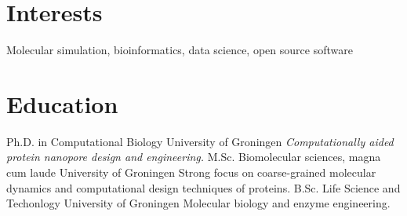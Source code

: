 \documentclass[letterpaper]{twentysecondcv} %
\begin{document}









\makeprofile %


\section{Interests}

Molecular simulation, bioinformatics, data science, open source software


\section{Education}

\begin{twenty} %
		{Ph.D. {\normalfont in Computational Biology}}
		{University of Groningen}
		{\emph{Computationally aided protein nanopore design and engineering.}}
		{M.Sc. Biomolecular sciences, magna cum laude}
		{University of Groningen}
		{Strong focus on coarse-grained molecular dynamics and computational design techniques of proteins.}
		{B.Sc. Life Science and Techonlogy}
		{University of Groningen}
		{Molecular biology and enzyme engineering.}
\end{twenty}
\end{document}
